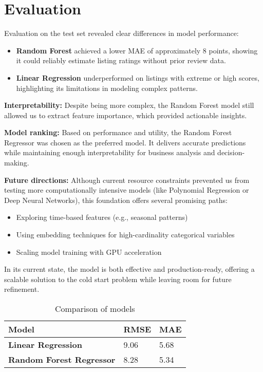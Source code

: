 \section{Evaluation }\label{chap:evaluation}
Evaluation on the test set revealed clear differences in model performance:

\begin{itemize}
    \item \textbf{Random Forest} achieved a lower MAE of approximately 8 points, showing it could reliably estimate listing ratings without prior review data.
    \item \textbf{Linear Regression} underperformed on listings with extreme or high scores, highlighting its limitations in modeling complex patterns.
\end{itemize}

\textbf{Interpretability:}
Despite being more complex, the Random Forest model still allowed us to extract feature importance, which provided actionable insights.

\textbf{Model ranking:}
Based on performance and utility, the Random Forest Regressor was chosen as the preferred model. It delivers accurate predictions while maintaining enough interpretability for business analysis and decision-making.

\textbf{Future directions:}
Although current resource constraints prevented us from testing more computationally intensive models (like Polynomial Regression or Deep Neural Networks), this foundation offers several promising paths:
\begin{itemize}
    \item Exploring time-based features (e.g., seasonal patterns)
    \item Using embedding techniques for high-cardinality categorical variables
    \item Scaling model training with GPU acceleration
\end{itemize}

In its current state, the model is both effective and production-ready, offering a scalable solution to the cold start problem while leaving room for future refinement.

\begin{table}[ht!]
    \small
    \centering
    \caption{Comparison of models}\label{tab:model_comparison}
    \begin{tabular}{lll}
        \toprule
        Model                            & {RMSE} & {MAE} \\
        \midrule
        \textbf{Linear Regression}       & 9.06   & 5.68  \\
        \textbf{Random Forest Regressor} & 8.28   & 5.34  \\
        \bottomrule
    \end{tabular}
\end{table}